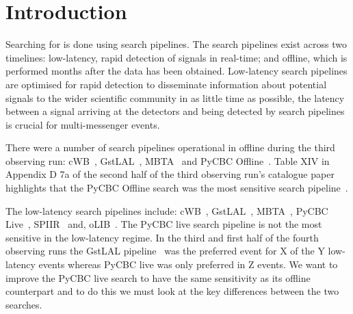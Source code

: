 
\section{\label{5:sec:introduction}Introduction}

Searching for \gws is done using search pipelines. The search pipelines exist across two timelines: low-latency, rapid detection of \gwadj signals in real-time; and offline, which is performed months after the data has been obtained. Low-latency search pipelines are optimised for rapid detection to disseminate information about potential \gwadj signals to the wider scientific community in as little time as possible, the latency between a \gwadj signal arriving at the detectors and being detected by search pipelines is crucial for multi-messenger events.

There were a number of \gwadj search pipelines operational in offline during the third observing run: cWB~\cite{cWB:2020}, GstLAL~\cite{GstLAL:2020}, MBTA~\cite{MBTA:2021} and PyCBC Offline~\cite{PyCBC_global:2020}. Table XIV in Appendix D 7a of the second half of the third observing run's catalogue paper~\cite{gwtc3:2023} highlights that the PyCBC Offline search was the most sensitive \gwadj search pipeline~\cite{PyCBC:2016, PyCBC:2017, PyCBC_package:2021}.

The low-latency \gwadj search pipelines include: cWB~\cite{cWB:2020}, GstLAL~\cite{GstLAL:2020}, MBTA~\cite{MBTA:2021}, PyCBC Live~\cite{PyCBC_Live:2018}, SPIIR~\cite{SPIIR:2020} and, oLIB~\cite{oLIB:2015}. The PyCBC live search pipeline is not the most sensitive in the low-latency regime. In the third and first half of the fourth observing runs the GstLAL pipeline~\cite{GstLAL:2020} 
was the preferred event for X of the Y low-latency events whereas PyCBC live was only preferred in Z events. We want to improve the PyCBC live search to have the same sensitivity as its offline counterpart and to do this we must look at the key differences between the two searches.

